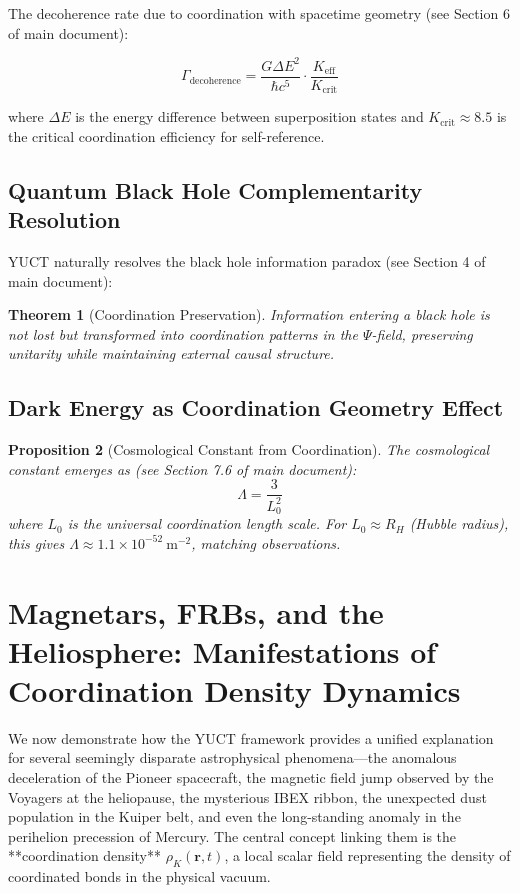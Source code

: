 \documentclass[12pt,a4paper]{article}
\newtheorem{theorem}{Theorem}[section]
\newtheorem{proposition}[theorem]{Proposition}
\theoremstyle{remark}
\newcommand{\Keff}{K_{\mathrm{eff}}}
\begin{document}
	The decoherence rate due to coordination with spacetime geometry (see Section 6 of main document):
	
	\begin{equation}
		\Gamma_{\text{decoherence}} = \frac{G \Delta E^2}{\hbar c^5} \cdot \frac{\Keff}{K_{\text{crit}}}
	\end{equation}
	
	where $\Delta E$ is the energy difference between superposition states and $K_{\text{crit}} \approx 8.5$ is the critical coordination efficiency for self-reference.
	
	\subsection{Quantum Black Hole Complementarity Resolution}
	
	YUCT naturally resolves the black hole information paradox (see Section 4 of main document):
	
	\begin{theorem}[Coordination Preservation]
		Information entering a black hole is not lost but transformed into coordination patterns in the $\Psi$-field, preserving unitarity while maintaining external causal structure.
	\end{theorem}
	
	\subsection{Dark Energy as Coordination Geometry Effect}
	
	\begin{proposition}[Cosmological Constant from Coordination]
		The cosmological constant emerges as (see Section 7.6 of main document):
		\[
		\Lambda = \frac{3}{L_0^2}
		\]
		where $L_0$ is the universal coordination length scale. For $L_0 \approx R_H$ (Hubble radius), this gives $\Lambda \approx 1.1 \times 10^{-52}\ \text{m}^{-2}$, matching observations.
	\end{proposition}
	
	\section{Magnetars, FRBs, and the Heliosphere: Manifestations of Coordination Density Dynamics}
	\label{sec:coord_density}
	
	We now demonstrate how the YUCT framework provides a unified explanation for several seemingly disparate astrophysical phenomena—the anomalous deceleration of the Pioneer spacecraft, the magnetic field jump observed by the Voyagers at the heliopause, the mysterious IBEX ribbon, the unexpected dust population in the Kuiper belt, and even the long-standing anomaly in the perihelion precession of Mercury. The central concept linking them is the **coordination density** \(\rho_K(\mathbf{r},t)\), a local scalar field representing the density of coordinated bonds in the physical vacuum.
	
\end{document}
